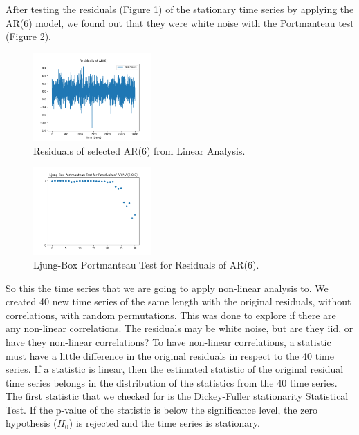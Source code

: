 \documentclass[conference]{IEEEtran}
\begin{document}
After testing the residuals (Figure \ref{resa}) of the stationary time series by applying the AR(6) model, we found out that they were white noise with the Portmanteau test (Figure \ref{porta}).

\begin{figure}[ht]
    \centering
    \includegraphics[width=0.40\textwidth]{Figures/AirportNonLin/Residuals of AR(6).png}
    \caption{Residuals of selected AR(6) from Linear Analysis.}
    \label{resa}
\end{figure}

\begin{figure}[ht]
    \centering
    \includegraphics[width=0.40\textwidth]{Figures/AirportNonLin/Ljung-Box Portmanteau Test for Residuals of ARIMA(6,0,0).png}
    \caption{Ljung-Box Portmanteau Test for Residuals of AR(6).}
    \label{porta}
\end{figure}

So this the time series that we are going to apply non-linear analysis to. We created 40 new time series of the same length with the original residuals, without correlations, with random permutations. This was done to explore if there are any non-linear correlations. The residuals may be white noise, but are they iid, or have they non-linear correlations? To have non-linear correlations, a statistic must have a little difference in the original residuals in respect to the 40 time series. If a statistic is linear, then the estimated statistic of the original residual time series belongs in the distribution of the statistics from the 40 time series. The first statistic that we checked for is the Dickey-Fuller stationarity Statistical Test. If the p-value of the statistic is below the significance level, the zero hypothesis ($H_0$) is rejected and the time series is stationary.
\end{document}
